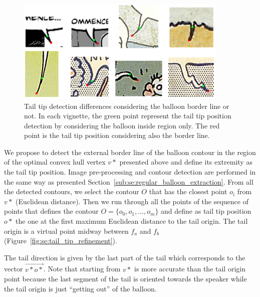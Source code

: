     \begin{figure}[ht]%
      \centering
      \includegraphics[width=0.9\textwidth]{tail_examples.png}
    \caption[Tail tip position precise position]{Tail tip detection differences considering the balloon border line or not. In each vignette, the green point represent the tail tip position detection by considering the balloon inside region only.
    The red point is the tail tip position considering also the border line.}
    \label{fig:se:tail_examples}
    \end{figure}

We propose to detect the external border line of the balloon contour in the region of the optimal convex hull vertex $v*$ presented above and define its extremity as the tail tip position.
Image pre-processing and contour detection are performed in the same way as presented Section~\ref{sub:se:regular_balloon_extraction}.
From all the detected contours, we select the contour $O$ that has the closest point $o_i$ from $v*$ (Euclidean distance).
Then we run through all the points of the sequence of points that defines the contour $O=\{o_0, o_1,...,o_m\}$ and define as tail tip position $o*$ the one at the first maximum Euclidean distance to the tail origin.
The tail origin is a virtual point midway between $f_a$ and $f_b$ (Figure~\ref{fig:se:tail_tip_refinement}).


The tail direction is given by the last part of the tail which corresponds to the vector $\overrightarrow{v*o*}$.
Note that starting from $v*$ is more accurate than the tail origin point because the last segment of the tail is oriented towards the speaker while the tail origin is just ``getting out'' of the balloon.


